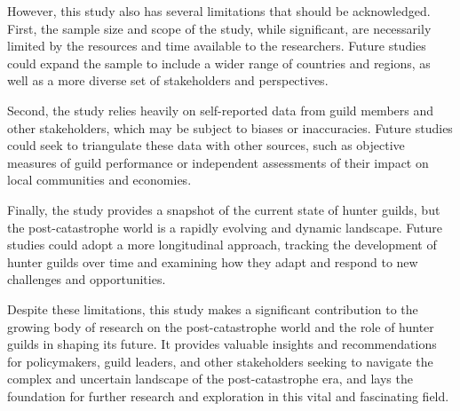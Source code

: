 \documentclass[12pt]{article}
\begin{document}
However, this study also has several limitations that should be acknowledged. First, the sample size and scope of the study, while significant, are necessarily limited by the resources and time available to the researchers. Future studies could expand the sample to include a wider range of countries and regions, as well as a more diverse set of stakeholders and perspectives.

Second, the study relies heavily on self-reported data from guild members and other stakeholders, which may be subject to biases or inaccuracies. Future studies could seek to triangulate these data with other sources, such as objective measures of guild performance or independent assessments of their impact on local communities and economies.

Finally, the study provides a snapshot of the current state of hunter guilds, but the post-catastrophe world is a rapidly evolving and dynamic landscape. Future studies could adopt a more longitudinal approach, tracking the development of hunter guilds over time and examining how they adapt and respond to new challenges and opportunities.

Despite these limitations, this study makes a significant contribution to the growing body of research on the post-catastrophe world and the role of hunter guilds in shaping its future. It provides valuable insights and recommendations for policymakers, guild leaders, and other stakeholders seeking to navigate the complex and uncertain landscape of the post-catastrophe era, and lays the foundation for further research and exploration in this vital and fascinating field.



\end{document}
